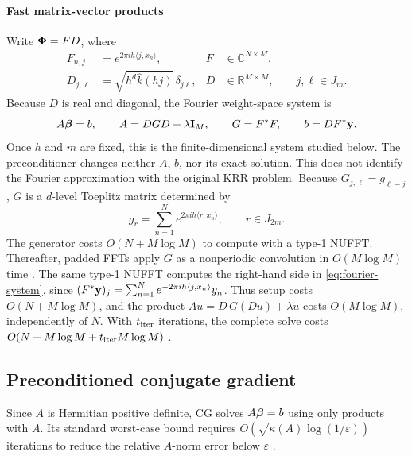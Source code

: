 \paragraph{Fast matrix-vector products}
Write \(\boldsymbol\Phi=FD\), where
\[
\begin{aligned}
F_{n,j}&=e^{2\pi i h\langle j,x_n\rangle},
&F&\in\mathbb C^{N\times M},\\
D_{j,\ell}&=\sqrt{h^d\widehat k(hj)}\,\delta_{j\ell},
&D&\in\mathbb R^{M\times M},
\qquad j,\ell\in J_m.
\end{aligned}
\]
Because \(D\) is real and diagonal, the Fourier weight-space system is
\begin{equation}
    A\boldsymbol\beta=b,
    \qquad A=DGD+\lambda\mathbf I_M,
    \qquad G=F^*F,
    \qquad b=DF^*\mathbf y.
    \label{eq:fourier-system}
\end{equation}
Once \(h\) and \(m\) are fixed, this is the finite-dimensional system studied
below. The preconditioner changes neither \(A\), \(b\), nor its exact
solution. This does not identify the Fourier approximation with the original
KRR problem.
Because \(G_{j,\ell}=g_{\ell-j}\), \(G\) is a
\(d\)-level Toeplitz matrix determined by
\[
    g_r
    =
    \sum_{n=1}^N
    e^{2\pi i h\langle r,x_n\rangle},
    \qquad r\in J_{2m}.
\]
The generator costs \(O(N+M\log M)\) to compute with a type-1 NUFFT.
Thereafter, padded FFTs apply \(G\) as a nonperiodic convolution in
\(O(M\log M)\) time
\cite{greengard2025efgp,barnett2019finufft,shih2021cufinufft}. The same
type-1 NUFFT computes the right-hand side in \cref{eq:fourier-system}, since
\((F^*\mathbf y)_j=\sum_{n=1}^N
e^{-2\pi i h\langle j,x_n\rangle}y_n\). Thus setup costs
\(O(N+M\log M)\), and the product
\(Au=D\,G(Du)+\lambda u\) costs \(O(M\log M)\), independently of \(N\).
With \(t_{\rm iter}\) iterations, the complete solve costs
\(O(N+M\log M+t_{\rm iter}M\log M)\)
\cite{greengard2025efgp,barnett2024uniform}.



\subsection{Preconditioned conjugate gradient}
\label{subsec:pcg}
Since \(A\) is Hermitian positive definite, CG solves \(A\boldsymbol\beta=b\) using
only products with \(A\). Its standard worst-case bound requires
\(O(\sqrt{\kappa(A)}\log(1/\varepsilon))\) iterations to reduce the relative
\(A\)-norm error below \(\varepsilon\)
\cite{hestenes1952methods,saad2003iterative,trefethen1997numerical}.


